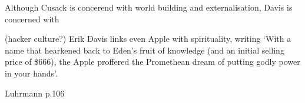 Although Cusack is concerend with world building and externalisation,
Davis is concerned with


(hacker culture?) Erik Davis \parencite*[166]{Davis98} links even Apple with spirituality, writing
`With a name that hearkened back to Eden's fruit of knowledge
(and an initial selling price of \$666), the Apple proffered the
Promethean dream of putting godly power in your hands'.

Luhrmann p.106


\clearpage
\printbibliography

